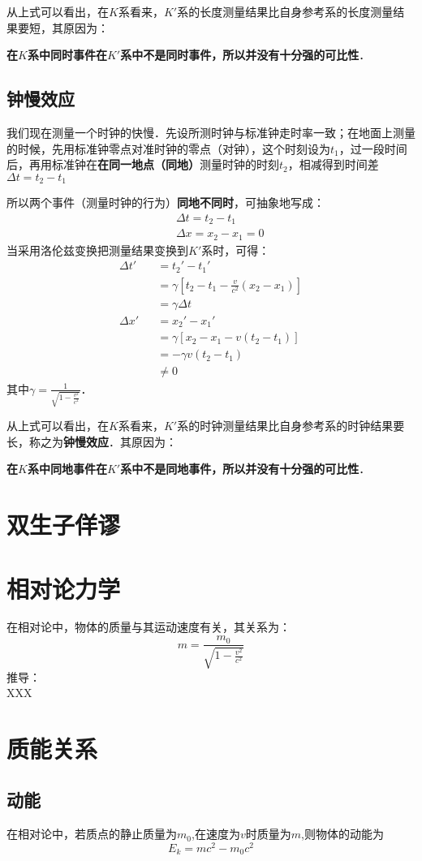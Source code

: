 \documentclass[11pt]{article}
\newcommand{\be}{\begin{equation}}
\newcommand{\ee}{\end{equation}}
\newcommand{\bea}{\setlength\arraycolsep{2pt} \begin{eqnarray}}
\newcommand{\eea}{\end{eqnarray}}
\numberwithin{equation}{section}
\begin{document}
\begin{CJK}{GBK}{song}
从上式可以看出，在$K$系看来，$K'$系的长度测量结果比自身参考系的长度测量结果要短，其原因为：

\textbf{在$K$系中同时事件在$K'$系中不是同时事件，所以并没有十分强的可比性}．
\subsection{钟慢效应}
我们现在测量一个时钟的快慢．先设所测时钟与标准钟走时率一致；在地面上测量的时候，先用标准钟零点对准时钟的零点（对钟），这个时刻设为$t_1$，过一段时间后，再用标准钟在\textbf{在同一地点（同地）}测量时钟的时刻$t_2$，相减得到时间差$\Delta t=t_2-t_1$

所以两个事件（测量时钟的行为）\textbf{同地不同时}，可抽象地写成：
\bea
&&\Delta t=t_2-t_1 \\
&&\Delta x =x_2-x_1=0
\eea
当采用洛伦兹变换把测量结果变换到$K'$系时，可得：
\bea
\Delta t'&&=t_2'-t_1' \\
&&=\gamma[t_2-t_1-\frac{v}{c^2}(x_2-x_1)]\\
&&=\gamma \Delta t \\
\Delta x'&&=x_2'-x_1' \\
&&=\gamma[x_2-x_1-v(t_2-t_1)]\\
&&=-\gamma v(t_2-t_1) \\
&&\not =0
\eea
其中$\gamma=\frac{1}{\sqrt{1-\frac{v^2}{c^2}}}$．

从上式可以看出，在$K$系看来，$K'$系的时钟测量结果比自身参考系的时钟结果要长，称之为\textbf{钟慢效应}．其原因为：

\textbf{在$K$系中同地事件在$K'$系中不是同地事件，所以并没有十分强的可比性}．

\section{双生子佯谬}
\section{相对论力学}
在相对论中，物体的质量与其运动速度有关，其关系为：
\be
m=\frac{m_0}{\sqrt{1-\frac{v^2}{c^2}}}
\ee
推导：\\
XXX

\section{质能关系}
\subsection{动能}
在相对论中，若质点的静止质量为$m_0$,在速度为$v$时质量为$m$,则物体的动能为
\be
E_k=mc^2-m_0c^2
\ee


\end{CJK}
\end{document}
